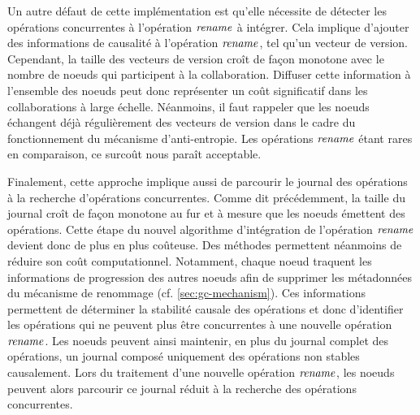 Un autre défaut de cette implémentation est qu'elle nécessite de détecter les opérations concurrentes à l'opération $\mathit{rename}$ à intégrer.
Cela implique d'ajouter des informations de causalité à l'opération $\mathit{rename}$, tel qu'un vecteur de version.
Cependant, la taille des vecteurs de version croît de façon monotone avec le nombre de noeuds qui participent à la collaboration.
Diffuser cette information à l'ensemble des noeuds peut donc représenter un coût significatif dans les collaborations à large échelle.
Néanmoins, il faut rappeler que les noeuds échangent déjà régulièrement des vecteurs de version dans le cadre du fonctionnement du mécanisme d'anti-entropie.
Les opérations $\mathit{rename}$ étant rares en comparaison, ce surcoût nous paraît acceptable.

Finalement, cette approche implique aussi de parcourir le journal des opérations à la recherche d'opérations concurrentes.
Comme dit précédemment, la taille du journal croît de façon monotone au fur et à mesure que les noeuds émettent des opérations.
Cette étape du nouvel algorithme d'intégration de l'opération $\mathit{rename}$ devient donc de plus en plus coûteuse.
Des méthodes permettent néanmoins de réduire son coût computationnel.
Notamment, chaque noeud traquent les informations de progression des autres noeuds afin de supprimer les métadonnées du mécanisme de renommage (cf. \autoref{sec:gc-mechanism}).
Ces informations permettent de déterminer la stabilité causale des opérations et donc d'identifier les opérations qui ne peuvent plus être concurrentes à une nouvelle opération $\mathit{rename}$.
Les noeuds peuvent ainsi maintenir, en plus du journal complet des opérations, un journal composé uniquement des opérations non stables causalement.
Lors du traitement d'une nouvelle opération $\mathit{rename}$, les noeuds peuvent alors parcourir ce journal réduit à la recherche des opérations concurrentes.
